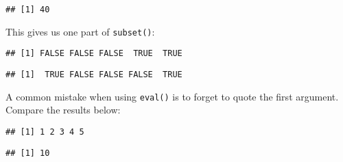 \begin{verbatim}
## [1] 40
\end{verbatim}

This gives us one part of \texttt{subset()}:

\begin{Shaded}
\begin{Highlighting}[]
\NormalTok{(}\OperatorTok{>=}\StringTok{ }
\end{Highlighting}
\end{Shaded}

\begin{verbatim}
## [1] FALSE FALSE FALSE  TRUE  TRUE
\end{verbatim}

\begin{Shaded}
\begin{Highlighting}[]
\NormalTok{(}\OperatorTok{==}\StringTok{ }
\end{Highlighting}
\end{Shaded}

\begin{verbatim}
## [1]  TRUE FALSE FALSE FALSE  TRUE
\end{verbatim}

A common mistake when using \texttt{eval()} is to forget to quote the
first argument. Compare the results below:

\begin{Shaded}
\begin{Highlighting}[]
\StringTok{ }
\NormalTok{(}
\end{Highlighting}
\end{Shaded}

\begin{verbatim}
## [1] 1 2 3 4 5
\end{verbatim}

\begin{Shaded}
\begin{Highlighting}[]
\end{Highlighting}
\end{Shaded}

\begin{verbatim}
## [1] 10
\end{verbatim}

